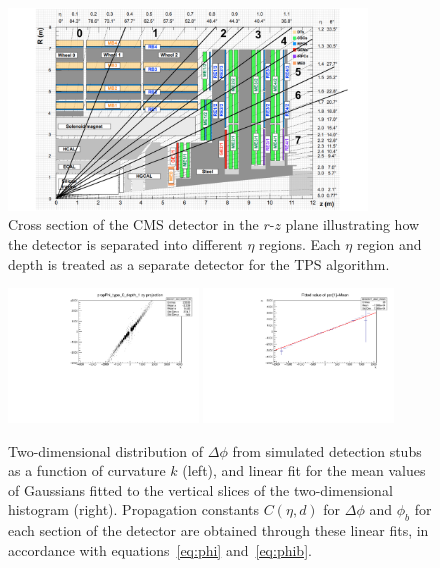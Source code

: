\begin{figure}[htbp]
  \centering
  \includegraphics[width=0.85\textwidth]{fig/TPS/barrelEta.pdf}
  \caption{
    Cross section of the CMS detector in the $r$-$z$ plane illustrating how the detector is separated into different $\eta$ regions.
    Each $\eta$ region and depth is treated as a separate detector for the TPS algorithm.
  }
  \label{fig:barrelEta}
\end{figure}

\begin{figure}[htbp] %
  \centering
  \includegraphics[width=0.45\textwidth]{fig/TPS/deltaPhi_2D.pdf}
  \includegraphics[width=0.45\textwidth]{fig/TPS/deltaPhi_mean.pdf}\\
  \caption{
    Two-dimensional distribution of $\Delta\phi$ from simulated detection stubs as a function of curvature $k$ (left), and linear fit for the mean values of Gaussians fitted to the vertical slices of the two-dimensional histogram (right).
    Propagation constants $C(\eta,d)$ for $\Delta\phi$ and $\phi_b$ for each section of the detector are obtained through these linear fits, in accordance with equations~\ref{eq:phi} and~\ref{eq:phib}.
  }
  \label{fig:deltaPhiHist}
\end{figure}

